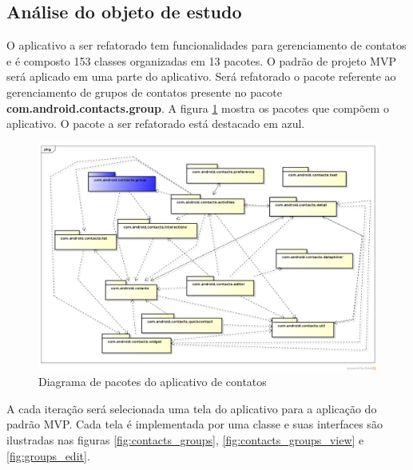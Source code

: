 \documentclass[conference]{IEEEtran}
\begin{document}
\subsection{Análise do objeto de estudo}

O aplicativo a ser refatorado tem funcionalidades para gerenciamento de
contatos e é composto 153 classes organizadas em 13 pacotes. O padrão
de projeto MVP será aplicado em uma parte do aplicativo. Será refatorado o
pacote referente ao gerenciamento de grupos de contatos presente no pacote
\textbf{com.android.contacts.group}. A figura \ref{fig:pacotes_contacts}
mostra os pacotes que compõem o aplicativo. O pacote a ser refatorado está
destacado em azul.

\begin{figure}[htb]
	\begin{center}
		\includegraphics[scale=0.40,width=\textwidth]{img/pacotes_contacts.png}
	\end{center}
	\caption{\label{fig:pacotes_contacts} Diagrama de pacotes do aplicativo de contatos}	
\end{figure}

A cada iteração será selecionada uma tela do aplicativo para a aplicação do
padrão MVP. Cada tela é implementada por uma classe e suas interfaces
são ilustradas nas figuras \ref{fig:contacts_groups},
\ref{fig:contacts_groups_view} e \ref{fig:groups_edit}. 
\end{document}
